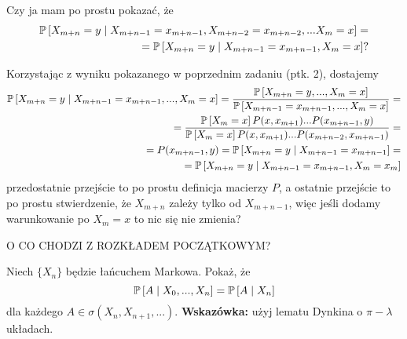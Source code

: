 \begin{solution}
  Czy ja mam po prostu pokazać, że 
  \begin{align*}
    \prob{X_{m+n}=y}{X_{m+n-1}=x_{m+n-1}, X_{m+n-2}=x_{m+n-2},... X_m=x}=\\ 
    =\prob{X_{m+n}=y}{X_{m+n-1}=x_{m+n-1}, X_m=x}?
  \end{align*}

  Korzystając z wyniku pokazanego w poprzednim zadaniu (ptk. 2), dostajemy
  \begin{align*}
    \prob{X_{m+n}=y}{X_{m+n-1}=x_{m+n-1},..., X_m=x}=\frac{\prob{X_{m+n}=y,..., X_m=x}}{\prob{X_{m+n-1}=x_{m+n-1},..., X_m=x}}=\\ 
                                                    =\frac{\prob{X_m=x}P(x, x_{m+1})...P(x_{m+n-1}, y)}{\prob{X_m=x}P(x, x_{m+1})...P(x_{m+n-2}, x_{m+n-1})}=\\ 
                                                    =P(x_{m+n-1}, y)=\prob{X_{m+n}=y}{X_{m+n-1}=x_{m+n-1}}=\\ 
                                                    =\prob{X_{m+n}=y}{X_{m+n-1}=x_{m+n-1}, X_m=x_m}
  \end{align*}
  przedostatnie przejście to po prostu definicja macierzy $P$, a ostatnie przejście to po prostu stwierdzenie, że $X_{m+n}$ zależy tylko od $X_{m+n-1}$, więc jeśli dodamy warunkowanie po $X_m=x$ to nic się nie zmienia?

  {\color{red}O CO CHODZI Z ROZKŁADEM POCZĄTKOWYM?}
\end{solution}

\begin{problem}
  Niech $\{X_n\}$ będzie łańcuchem Markowa. Pokaż, że 
  $$\prob{A}{X_0,..., X_n}=\prob{A}{X_n}$$
  dla każdego $A\in \sigma(X_n, X_{n+1},...)$. \textbf{Wskazówka:} użyj lematu Dynkina o $\pi-\lambda$ układach.
\end{problem}

